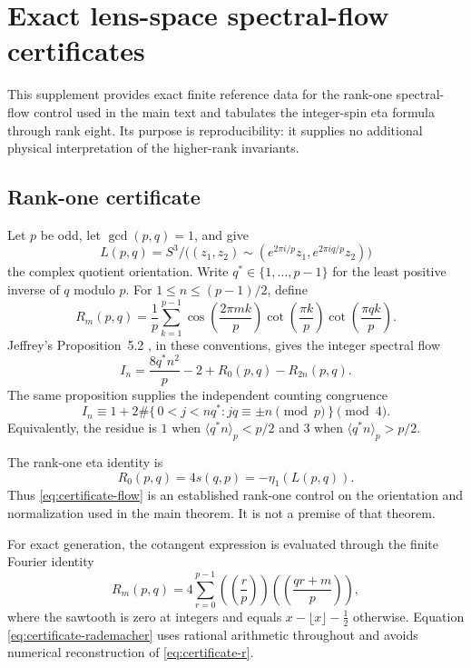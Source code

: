 \section{Exact lens-space spectral-flow certificates}
\label{app:certificates}

This supplement provides exact finite reference data for the rank-one
spectral-flow control used in the main text and tabulates the integer-spin eta
formula through rank eight.  Its purpose is reproducibility: it supplies no
additional physical interpretation of the higher-rank invariants.

\subsection{Rank-one certificate}

Let $p$ be odd, let $\gcd(p,q)=1$, and give
\[
 L(p,q)=S^3/\bigl((z_1,z_2)\sim
 (e^{2\pi i/p}z_1,e^{2\pi iq/p}z_2)\bigr)
\]
the complex quotient orientation.  Write
$q^*\in\{1,\ldots,p-1\}$ for the least positive inverse of $q$ modulo $p$.
For $1\leq n\leq(p-1)/2$, define
\begin{equation}
 R_m(p,q)=\frac1p\sum_{k=1}^{p-1}
 \cos\!\left(\frac{2\pi mk}{p}\right)
 \cot\!\left(\frac{\pi k}{p}\right)
 \cot\!\left(\frac{\pi qk}{p}\right).
 \label{eq:certificate-r}
\end{equation}
Jeffrey's Proposition~5.2 \cite{Jeffrey1992}, in these conventions, gives the
integer spectral flow
\begin{equation}
 I_n=\frac{8q^*n^2}{p}-2+R_0(p,q)-R_{2n}(p,q).
 \label{eq:certificate-flow}
\end{equation}
The same proposition supplies the independent counting congruence
\begin{equation}
 I_n\equiv
 1+2\#\{\,0<j<nq^*:jq\equiv\pm n\pmod p\,\}\pmod4.
 \label{eq:certificate-parity}
\end{equation}
Equivalently, the residue is $1$ when
$\langle q^*n\rangle_p<p/2$ and $3$ when
$\langle q^*n\rangle_p>p/2$.

The rank-one eta identity is
\begin{equation}
 R_0(p,q)=4s(q,p)=-\eta_1(L(p,q)).
 \label{eq:certificate-rank-one}
\end{equation}
Thus \eqref{eq:certificate-flow} is an established rank-one control on the
orientation and normalization used in the main theorem.  It is not a premise
of that theorem.

For exact generation, the cotangent expression is evaluated through the
finite Fourier identity
\begin{equation}
 R_m(p,q)=4\sum_{r=0}^{p-1}
 \left(\!\left(\frac rp\right)\!\right)
 \left(\!\left(\frac{qr+m}{p}\right)\!\right),
 \label{eq:certificate-rademacher}
\end{equation}
where the sawtooth is zero at integers and equals
$x-\lfloor x\rfloor-\tfrac12$ otherwise.  Equation
\eqref{eq:certificate-rademacher} uses rational arithmetic throughout and
avoids numerical reconstruction of \eqref{eq:certificate-r}.

